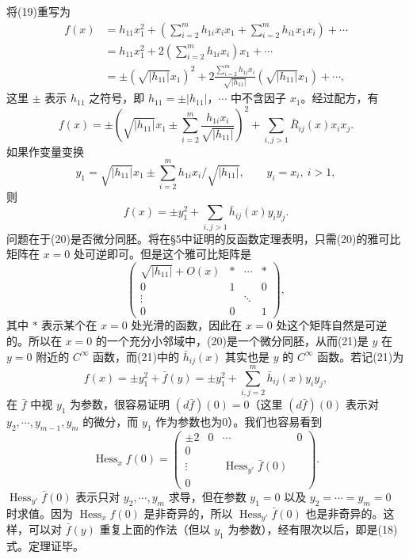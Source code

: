将(19)重写为
\begin{align*}
 f(x)
 &=h_{11}x_1^2+\left(\sum_{i=2}^m h_{1i}x_ix_1+\sum_{i=2}^m h_{i1}x_1x_i\right)+\cdots\\
 &=h_{11}x_1^2+2\left(\sum_{i=2}^m h_{1i}x_i\right)x_1+\cdots\\
 &=\pm(\sqrt{|h_{11}|}x_1)^2
 +2\frac{\sum_{i=2}^m h_{1i}x_i}{\sqrt{|h_{11}|}}(\sqrt{|h_{11}|}x_1)+\cdots,
\end{align*}
这里 $\pm$ 表示 $h_{11}$ 之符号，即 $h_{11}=\pm|h_{11}|$，$\cdots$ 中不含因子 $x_1$。经过配方，有
\[
 f(x)=\pm\left(\sqrt{|h_{11}|}x_1\pm\sum_{i=2}^m\frac{h_{1i}x_i}{\sqrt{|h_{11}|}}\right)^2
 +\sum_{i,j>1}\bar R_{ij}(x)x_ix_j.
\]
如果作变量变换
\begin{equation}
 y_1=\sqrt{|h_{11}|}x_1\pm\sum_{i=2}^m h_{1i}x_i/\sqrt{|h_{11}|},\qquad
 y_i=x_i,\ i>1,
 \tag{20}
\end{equation}
则
\begin{equation}
 f(x)=\pm y_1^2+\sum_{i,j>1}\bar h_{ij}(x)y_i y_j.
 \tag{21}
\end{equation}
问题在于(20)是否微分同胚。将在§5中证明的反函数定理表明，只需(20)的雅可比矩阵在 $x=0$ 处可逆即可。但是这个雅可比矩阵是
\[
 \begin{pmatrix}
 \sqrt{|h_{11}|}+O(x)&*&\cdots&*\\
 0&1&&0\\
 \vdots&&\ddots&\\
 0&0&&1
 \end{pmatrix},
\]
其中 $*$ 表示某个在 $x=0$ 处光滑的函数，因此在 $x=0$ 处这个矩阵自然是可逆的。所以在 $x=0$ 的一个充分小邻域中，(20)是一个微分同胚，从而(21)是 $y$ 在 $y=0$ 附近的 $C^\infty$ 函数，而(21)中的 $\bar h_{ij}(x)$ 其实也是 $y$ 的 $C^\infty$ 函数。若记(21)为
\[
 f(x)=\pm y_1^2+\bar f(y)=\pm y_1^2+\sum_{i,j=2}^m\bar h_{ij}(x)y_i y_j,
\]
在 $\bar f$ 中视 $y_1$ 为参数，很容易证明 $(d\bar f)(0)=0$（这里 $(d\bar f)(0)$ 表示对 $y_2,\cdots,y_{m-1},y_m$ 的微分，而 $y_1$ 作为参数也为0）。我们也容易看到
\[
 \operatorname{Hess}_x f(0)=
 \begin{pmatrix}
 \pm2&0&\cdots&0\\
 0&&&\\
 \vdots&&\operatorname{Hess}_{y'}\bar f(0)&\\
 0&&&
 \end{pmatrix}.
\]
\enlargethispage{1.5\baselineskip}
$\operatorname{Hess}_{y'}\bar f(0)$ 表示只对 $y_2,\cdots,y_m$ 求导，但在参数 $y_1=0$ 以及 $y_2=\cdots=y_m=0$ 时求值。因为 $\operatorname{Hess}_x f(0)$ 是非奇异的，所以 $\operatorname{Hess}_{y'}\bar f(0)$ 也是非奇异的。这样，可以对 $\bar f(y)$ 重复上面的作法（但以 $y_1$ 为参数），经有限次以后，即是(18)式。定理证毕。

